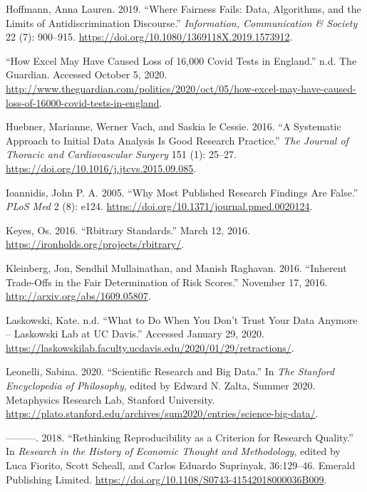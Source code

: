 \documentclass[
]{article}
\newlength{\cslhangindent}
\newenvironment{cslreferences}%
  {\setlength{\parindent}{0pt}%
  \everypar{\setlength{\hangindent}{\cslhangindent}}\ignorespaces}%
  {\par}
\begin{document}
\begin{cslreferences}
\leavevmode\hypertarget{ref-HoffmannWhereFairnessFails2019}{}%
Hoffmann, Anna Lauren. 2019. ``Where Fairness Fails: Data, Algorithms, and the Limits of Antidiscrimination Discourse.'' \emph{Information, Communication \& Society} 22 (7): 900--915. \url{https://doi.org/10.1080/1369118X.2019.1573912}.

\leavevmode\hypertarget{ref-HowExcelMay2020}{}%
``How Excel May Have Caused Loss of 16,000 Covid Tests in England.'' n.d. The Guardian. Accessed October 5, 2020. \url{http://www.theguardian.com/politics/2020/oct/05/how-excel-may-have-caused-loss-of-16000-covid-tests-in-england}.

\leavevmode\hypertarget{ref-HuebnerSystematicApproachInitial2016}{}%
Huebner, Marianne, Werner Vach, and Saskia le Cessie. 2016. ``A Systematic Approach to Initial Data Analysis Is Good Research Practice.'' \emph{The Journal of Thoracic and Cardiovascular Surgery} 151 (1): 25--27. \url{https://doi.org/10.1016/j.jtcvs.2015.09.085}.

\leavevmode\hypertarget{ref-IoannidisWhyMostPublished2005}{}%
Ioannidis, John P. A. 2005. ``Why Most Published Research Findings Are False.'' \emph{PLoS Med} 2 (8): e124. \url{https://doi.org/10.1371/journal.pmed.0020124}.

\leavevmode\hypertarget{ref-KeyesRbitraryStandards2016}{}%
Keyes, Os. 2016. ``Rbitrary Standards.'' March 12, 2016. \url{https://ironholds.org/projects/rbitrary/}.

\leavevmode\hypertarget{ref-KleinbergInherentTradeOffsFair2016}{}%
Kleinberg, Jon, Sendhil Mullainathan, and Manish Raghavan. 2016. ``Inherent Trade-Offs in the Fair Determination of Risk Scores.'' November 17, 2016. \url{http://arxiv.org/abs/1609.05807}.

\leavevmode\hypertarget{ref-LaskowskiWhatWhenYou}{}%
Laskowski, Kate. n.d. ``What to Do When You Don't Trust Your Data Anymore -- Laskowski Lab at UC Davis.'' Accessed January 29, 2020. \url{https://laskowskilab.faculty.ucdavis.edu/2020/01/29/retractions/}.

\leavevmode\hypertarget{ref-LeonelliScientificResearchBig2020}{}%
Leonelli, Sabina. 2020. ``Scientific Research and Big Data.'' In \emph{The Stanford Encyclopedia of Philosophy}, edited by Edward N. Zalta, Summer 2020. Metaphysics Research Lab, Stanford University. \url{https://plato.stanford.edu/archives/sum2020/entries/science-big-data/}.

\leavevmode\hypertarget{ref-LeonelliRethinkingReproducibilityCriterion2018}{}%
---------. 2018. ``Rethinking Reproducibility as a Criterion for Research Quality.'' In \emph{Research in the History of Economic Thought and Methodology}, edited by Luca Fiorito, Scott Scheall, and Carlos Eduardo Suprinyak, 36:129--46. Emerald Publishing Limited. \url{https://doi.org/10.1108/S0743-41542018000036B009}.


\end{cslreferences}
\end{document}
